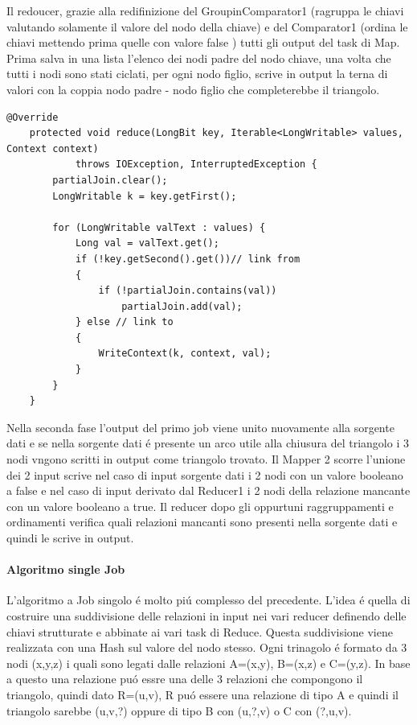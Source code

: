 \documentclass[paper=a4, fontsize=11pt]{scrartcl}	%
\numberwithin{equation}{section}															%
\numberwithin{figure}{section}																%
\numberwithin{table}{section}																%
\begin{document}
Il redoucer, grazie alla redifinizione del GroupinComparator1 (ragruppa le chiavi valutando solamente il valore del nodo della chiave) e  del Comparator1 (ordina le chiavi mettendo prima quelle con valore false ) tutti gli output del task di Map. Prima salva in una lista l'elenco dei nodi padre del nodo chiave, una volta che tutti i nodi sono stati ciclati, per ogni nodo figlio, scrive in output la terna di valori con la coppia nodo padre - nodo figlio che completerebbe il triangolo.
\begin{lstlisting}[label=Reducer1,caption=Implementazione del Reducer1]	
	@Override
	protected void reduce(LongBit key, Iterable<LongWritable> values, Context context)
			throws IOException, InterruptedException {
		partialJoin.clear();
		LongWritable k = key.getFirst();

		for (LongWritable valText : values) {
			Long val = valText.get();
			if (!key.getSecond().get())// link from
			{
				if (!partialJoin.contains(val))
					partialJoin.add(val);
			} else // link to
			{
				WriteContext(k, context, val);
			}
		}
	}
\end{lstlisting}

Nella seconda fase l'output del primo job viene unito nuovamente alla sorgente dati e se nella sorgente dati \'e presente un arco utile alla chiusura del triangolo i 3 nodi vngono scritti in output come triangolo trovato.
Il Mapper 2 scorre l'unione dei 2 input scrive nel caso di input sorgente dati i 2 nodi con un valore booleano a false e nel caso di input derivato dal Reducer1 i 2 nodi della relazione mancante con un valore booleano a true. Il reducer dopo gli oppurtuni raggruppamenti e ordinamenti verifica quali relazioni mancanti sono presenti nella sorgente dati e quindi le scrive in output.

\paragraph{Algoritmo single Job}
L'algoritmo a Job singolo \'e molto pi\'u complesso del precedente.
L'idea \'e quella di costruire una suddivisione delle relazioni in input nei vari reducer definendo delle chiavi strutturate e abbinate ai vari task di Reduce. Questa suddivisione viene realizzata con una Hash sul valore del nodo stesso.
Ogni trinagolo \'e formato da  3 nodi (x,y,z) i quali sono legati dalle relazioni A=(x,y), B=(x,z) e C=(y,z). In base a questo una relazione pu\'o essre una delle 3 relazioni che compongono il triangolo, quindi dato R=(u,v), R pu\'o essere una relazione di tipo A e quindi  il triangolo sarebbe (u,v,?) oppure di tipo B con (u,?,v) o C con (?,u,v).
\end{document}
